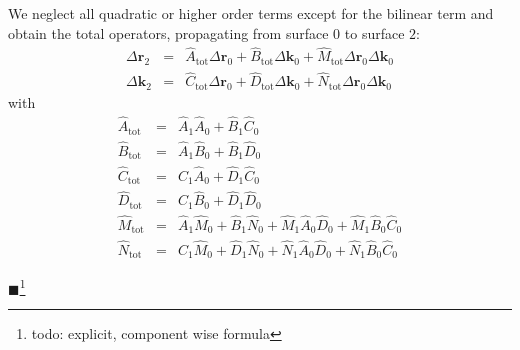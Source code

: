\documentclass[12pt,a4paper,twoside,openright,BCOR10mm,headsepline,titlepage,abstracton,chapterprefix,final]{scrreprt}
\newcommand\Vector[1]{{\mathbf{#1}}}
\newcommand\wavenumber{k}
\newcommand\Wavevector{\Vector{\wavenumber}}
\newcommand{\remark}[1]{{\color{red}$\blacksquare$}\footnote{{\color{red}#1}}}
\newcommand\tot{\textrm{tot}}
\begin{document}
We neglect all quadratic or higher order terms except for the bilinear term and obtain the total operators, 
propagating from surface $0$ to surface $2$:
\begin{subequations}
\begin{eqnarray}
 \Delta \Vector{r}_2  &=& \hat{A}_\tot \Delta \Vector{r}_0 + \hat{B}_\tot \Delta \Vector{k}_0 + \hat{M}_\tot \Delta \Vector{r}_0 \Delta \Vector{k}_0 \\ 
 \Delta \Wavevector_2 &=& \hat{C}_\tot \Delta \Vector{r}_0 + \hat{D}_\tot \Delta \Vector{k}_0 + \hat{N}_\tot \Delta \Vector{r}_0 \Delta \Vector{k}_0
\end{eqnarray}
\end{subequations}
with
\begin{subequations}\label{eq:xyuv_total_propagation}
\begin{eqnarray}
 \hat{A}_\tot &=& \hat{A}_1 \hat{A}_0 + \hat{B}_1 \hat{C}_0 \\
 \hat{B}_\tot &=& \hat{A}_1 \hat{B}_0 + \hat{B}_1 \hat{D}_0 \\
 \hat{C}_\tot &=& \hat{C}_1 \hat{A}_0 + \hat{D}_1 \hat{C}_0\\
 \hat{D}_\tot &=& \hat{C}_1 \hat{B}_0 + \hat{D}_1 \hat{D}_0 \\
 \hat{M}_\tot &=& \hat{A}_1 \hat{M}_0 + \hat{B}_1 \hat{N}_0 + \hat{M}_1 \hat{A}_0 \hat{D}_0 + \hat{M}_1 \hat{B}_0 \hat{C}_0 \\
 \hat{N}_\tot &=& \hat{C}_1 \hat{M}_0 + \hat{D}_1 \hat{N}_0 + \hat{N}_1 \hat{A}_0 \hat{D}_0 + \hat{N}_1 \hat{B}_0 \hat{C}_0
\end{eqnarray}
 \end{subequations}
 
\remark{todo: explicit, component wise formula}
\end{document}
